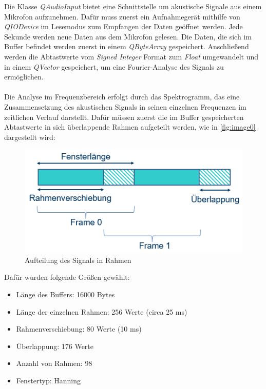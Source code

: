 Die Klasse \textit{QAudioInput} bietet eine Schnittstelle um akustische Signale aus einem Mikrofon aufzunehmen. Dafür muss zuerst ein Aufnahmegerät mithilfe von \textit{QIODevice} im Lesemodus zum Empfangen der Daten geöffnet werden. Jede Sekunde werden neue Daten aus dem Mikrofon gelesen. Die Daten, die sich im Buffer befindet werden zuerst in einem \textit{QByteArray} gespeichert. Anschließend werden die Abtastwerte vom \textit{Signed Integer} Format zum \textit{Float} umgewandelt und in einem \textit{QVector} gespeichert, um eine Fourier-Analyse des Signals zu ermöglichen.\\
\\
Die Analyse im Frequenzbereich erfolgt durch das Spektrogramm, das eine Zusammensetzung des akustischen Signals in seinen einzelnen Frequenzen im zeitlichen Verlauf darstellt. Dafür müssen zuerst die im Buffer gespeicherten Abtastwerte in sich überlappende Rahmen aufgeteilt werden, wie in \autoref{fig:image0} dargestellt wird:

\begin{figure}[h]
	\centering
	\includegraphics[width=1\textwidth]{BeatBilder/bild0.png}
	\caption{Aufteilung des Signals in Rahmen}
	\label{fig:image0}
\end{figure}

Dafür wurden folgende Größen gewählt:
 
\begin{center}
	\begin{itemize}
		\item Länge des Buffers: 16000 Bytes
		\item Länge der einzelnen Rahmen: 256 Werte (circa 25 ms)
		\item Rahmenverschiebung: 80 Werte (10 ms)
		\item Überlappung: 176 Werte
		\item Anzahl von Rahmen: 98
		\item Fenstertyp: Hanning
	\end{itemize}
\end{center}


